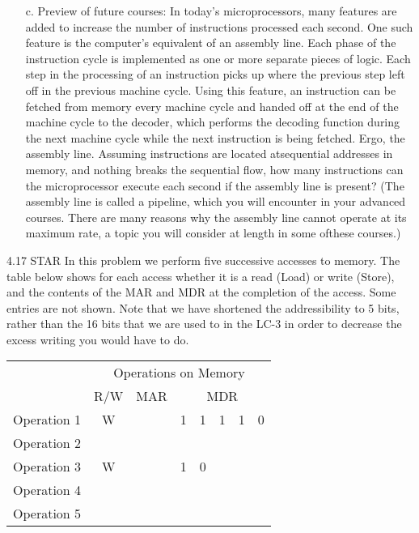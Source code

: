 \documentclass{patt}
\begin{document}
\begin{exercises}
\begin{enumerate}
\item[c.] Preview of future courses: In today's microprocessors, many
  features are added to increase the number of instructions processed
  each second.  One such feature is the computer's equivalent of an
  assembly line. Each phase of the instruction cycle is implemented as
  one or more separate pieces of logic.  Each step in the processing
  of an instruction picks up where the previous step left off in the
  previous machine cycle.  Using this feature, an instruction can be
  fetched\break
  from memory every machine cycle and handed off at the end of
  the machine cycle to the decoder, which performs the decoding
  function during the next machine cycle while the next instruction is
  being fetched.  Ergo, the assembly line.  Assuming instructions are
  located   at\break sequential addresses in memory, and nothing breaks the
  sequential flow, how many instructions can the microprocessor
  execute each second if the assembly line is present?  (The assembly
  line is called a pipeline, which you will encounter in your advanced
  courses.  There are many reasons why the assembly line cannot
  operate at its maximum rate, a topic you will consider at length in
  some of\break these courses.)
\end{enumerate}


\item[4.17]STAR In this problem we perform five successive accesses to memory.  The table below shows for each access whether it is a read (Load) or write (Store), and the contents of the MAR and MDR at the completion of the access.  Some entries are not shown.  Note that we have shortened the addressibility to
5 bits, rather than the 16 bits that we are used to in the LC-3 in order
to decrease the excess writing you would have to do.\\

\begin{center}

\begin{tabular}[t]{c|c|c|c|c|c|c|c|}
\multicolumn{1}{c}{} & \multicolumn{7}{c}{Operations on Memory} \\
\cline{2-8}
\multicolumn{1}{c|}{} & R/W & MAR & \multicolumn{5}{c|}{MDR} \\
\cline{2-8}
Operation 1 & W &  & 1 & 1 & 1 & 1 & 0 \\
\cline{2-8}
\cline{2-8}
Operation 2 &   & &   &   &   &   &   \\
\cline{2-8}
Operation 3 & W & & 1 & 0 & & & \\
\cline{2-8}
Operation 4 & & & & & & & \\
\cline{2-8}
Operation 5 & & & & & & & \\
\cline{2-8}
\end{tabular}
\end{center}


\end{exercises}
\end{document}
